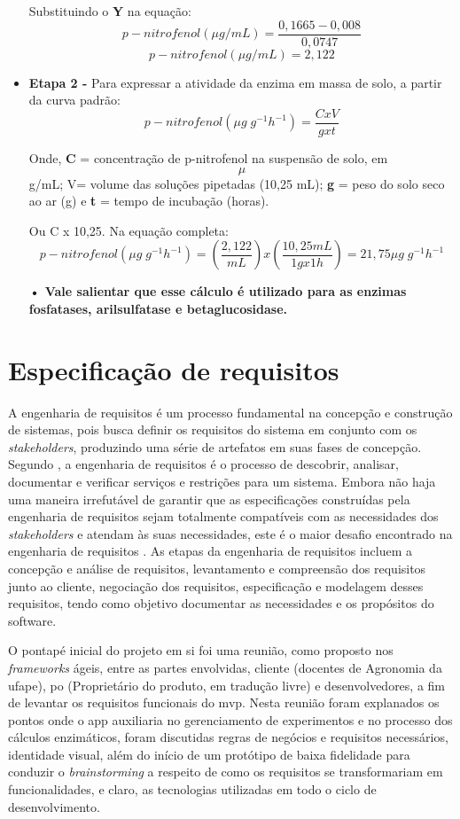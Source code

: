 \begin{itemize}
    Substituindo o \textbf{Y} na equação:
    \[p-nitrofenol (\mu g/mL) = \frac{0,1665 - 0,008}{0,0747}\]
    \[p-nitrofenol (\mu g/mL) = 2,122\]
    

   \item \textbf{Etapa 2 -} Para expressar a atividade da enzima em massa de solo, a partir da curva padrão:
    \[p-nitrofenol (\mu g\;g^{-1} h^{-1}) = \frac{C x V}{g x t}\]

    Onde, \textbf{C} = concentração de p-nitrofenol na suspensão de solo, em \[\mu\] g/mL; V= volume das soluções pipetadas (10,25 mL); \textbf{g} = peso do solo seco ao ar (g) e \textbf{t} = tempo de incubação (horas).

    Ou C x 10,25. Na equação completa:
    \[p-nitrofenol (\mu g\;g^{-1} h^{-1}) = \left(\frac{2,122}{mL} \right)x\left(\frac{10,25 mL}{1g x 1h} \right) = 21,75 \mu g\;g^{-1} h^{-1} \]

    \textbf{• Vale salientar que esse cálculo é utilizado para as enzimas fosfatases, arilsulfatase e betaglucosidase.}
    
 \end{itemize}


\section{Especificação de requisitos}\label{sec:especificacao_de_requisitos}
A engenharia de requisitos é um processo fundamental na concepção e construção de sistemas, pois busca definir os requisitos do sistema em conjunto com os \textit{stakeholders}, produzindo uma série de artefatos em suas fases de concepção. Segundo \cite{kotonya1998requirements}, a engenharia de requisitos é o processo de descobrir, analisar, documentar e verificar serviços e restrições para um sistema. Embora não haja uma maneira irrefutável de garantir que as especificações construídas pela engenharia de requisitos sejam totalmente compatíveis com as necessidades dos \textit{stakeholders} e atendam às suas necessidades, este é o maior desafio encontrado na engenharia de requisitos \cite{pressman2016engenharia}. As etapas da engenharia de requisitos incluem a concepção e análise de requisitos, levantamento e compreensão dos requisitos junto ao cliente, negociação dos requisitos, especificação e modelagem desses requisitos, tendo como objetivo documentar as necessidades e os propósitos do software.

O pontapé inicial do projeto em si foi uma reunião, como proposto nos \textit{frameworks} ágeis, entre as partes envolvidas, cliente (docentes de Agronomia da \ac{ufape}), \ac{po} (Proprietário do produto, em tradução livre) e desenvolvedores, a fim de levantar os requisitos funcionais do \ac{mvp}. Nesta reunião foram explanados os pontos onde o \ac{app} auxiliaria no gerenciamento de experimentos e no processo dos cálculos enzimáticos, foram discutidas regras de negócios e requisitos necessários, identidade visual, além do início de um protótipo de baixa fidelidade para conduzir o \textit{brainstorming} a respeito de como os requisitos se transformariam em funcionalidades, e claro, as tecnologias utilizadas em todo o ciclo de desenvolvimento.

